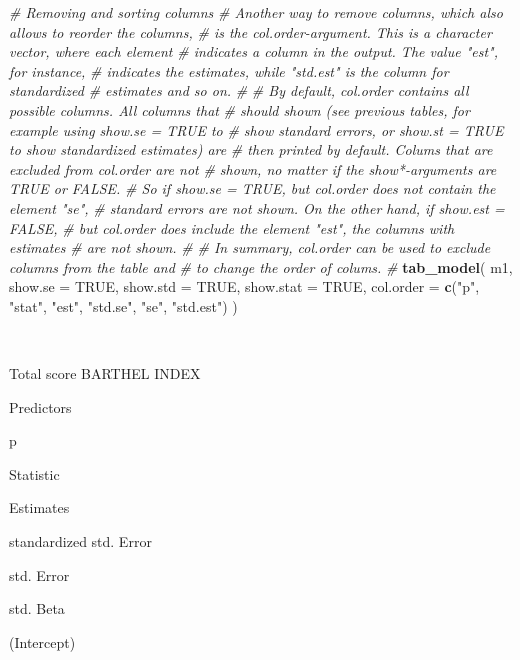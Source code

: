 \documentclass[]{article}
\newenvironment{Shaded}{\begin{snugshade}}{\end{snugshade}}
\newcommand{\KeywordTok}[1]{\textcolor[rgb]{0.13,0.29,0.53}{\textbf{#1}}}
\newcommand{\DataTypeTok}[1]{\textcolor[rgb]{0.13,0.29,0.53}{#1}}
\newcommand{\StringTok}[1]{\textcolor[rgb]{0.31,0.60,0.02}{#1}}
\newcommand{\CommentTok}[1]{\textcolor[rgb]{0.56,0.35,0.01}{\textit{#1}}}
\newcommand{\OtherTok}[1]{\textcolor[rgb]{0.56,0.35,0.01}{#1}}
\newcommand{\NormalTok}[1]{#1}
\begin{document}
\begin{Shaded}
\begin{Highlighting}[]
\CommentTok{# Removing and sorting columns}
\CommentTok{# Another way to remove columns, which also allows to reorder the columns, }
\CommentTok{# is the col.order-argument. This is a character vector, where each element}
\CommentTok{# indicates a column in the output. The value "est", for instance, }
\CommentTok{# indicates the estimates, while "std.est" is the column for standardized}
\CommentTok{# estimates and so on.}
\CommentTok{# }
\CommentTok{# By default, col.order contains all possible columns. All columns that}
\CommentTok{# should shown (see previous tables, for example using show.se = TRUE to }
\CommentTok{# show standard errors, or show.st = TRUE to show standardized estimates) are }
\CommentTok{# then printed by default. Colums that are excluded from col.order are not }
\CommentTok{# shown, no matter if the show*-arguments are TRUE or FALSE. }
\CommentTok{# So if show.se = TRUE, but col.order does not contain the element "se", }
\CommentTok{# standard errors are not shown. On the other hand, if show.est = FALSE,}
\CommentTok{# but col.order does include the element "est", the columns with estimates }
\CommentTok{# are not shown.}
\CommentTok{# }
\CommentTok{# In summary, col.order can be used to exclude columns from the table and }
\CommentTok{# to change the order of colums.}
\CommentTok{#}
\KeywordTok{tab_model}\NormalTok{(}
\NormalTok{  m1, }\DataTypeTok{show.se =} \OtherTok{TRUE}\NormalTok{, }\DataTypeTok{show.std =} \OtherTok{TRUE}\NormalTok{, }\DataTypeTok{show.stat =} \OtherTok{TRUE}\NormalTok{,}
  \DataTypeTok{col.order =} \KeywordTok{c}\NormalTok{(}\StringTok{"p"}\NormalTok{, }\StringTok{"stat"}\NormalTok{, }\StringTok{"est"}\NormalTok{, }\StringTok{"std.se"}\NormalTok{, }\StringTok{"se"}\NormalTok{, }\StringTok{"std.est"}\NormalTok{)}
\NormalTok{)}
\end{Highlighting}
\end{Shaded}

~

Total score BARTHEL INDEX

Predictors

p

Statistic

Estimates

standardized std. Error

std. Error

std. Beta

(Intercept)
\end{document}
